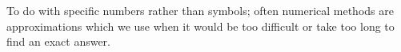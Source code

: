 To do with specific numbers rather than symbols;
often numerical methods are approximations which we
use when it would be too difficult or take too
long to find an exact answer.